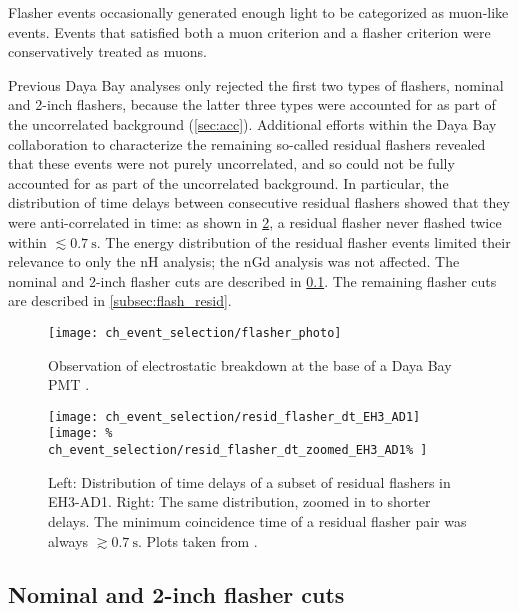 Flasher events occasionally generated enough light to be categorized as muon-like events.
Events that satisfied both a muon criterion and a flasher criterion
were conservatively treated as muons.

Previous Daya Bay analyses only rejected the first two types of flashers,
nominal and 2-inch flashers,
because the latter three types were accounted for
as part of the uncorrelated background (\cref{sec:acc}).
Additional efforts within the Daya Bay collaboration
to characterize the remaining so-called residual flashers 
revealed that these events were not purely uncorrelated,
and so could not be fully accounted for as part of the uncorrelated background.
In particular, the distribution of time delays
between consecutive residual flashers
showed that they were anti-correlated in time:
as shown in \cref{fig:flasher_anticorr},
a residual flasher never flashed twice within $\lesssim \SI{0.7}{\s}$.
The energy distribution of the residual flasher events
limited their relevance to only the nH analysis; the nGd analysis was not affected.
The nominal and 2-inch flasher cuts are described in \cref{subsec:flash_nominal}.
The remaining flasher cuts are described in \cref{subsec:flash_resid}.

\begin{figure}
    \centering
    \texttt{[image: ch\_event\_selection/flasher\_photo]}
    \caption[Photograph of flashing PMT]{
        Observation of electrostatic breakdown at the base of a Daya Bay PMT
        \cite{flasherphotos_docdb}.
    }
    \label{fig:flasher_photo}
\end{figure}

\begin{figure}
    \centering
    \texttt{[image: ch\_event\_selection/resid\_flasher\_dt\_EH3\_AD1]}
    \texttt{[image: \%
        ch\_event\_selection/resid\_flasher\_dt\_zoomed\_EH3\_AD1\%
    ]}
    \caption[Residual flasher $\Delta t$ distribution]{
        Left: Distribution of time delays
        of a subset of residual flashers in EH3-AD1.
        Right: The same distribution, zoomed in to shorter delays.
        The minimum coincidence time of a residual flasher pair was always
        $\gtrsim \SI{0.7}{\s}$.
        Plots taken from \cite{beda_resid_flasher_dt}.
    }
    \label{fig:flasher_anticorr}
\end{figure}

\subsection{Nominal and 2-inch flasher cuts}
\label{subsec:flash_nominal}

